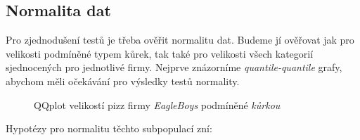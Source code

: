 \subsection{Normalita dat}%
\label{sub:normalita_dat}
Pro zjednodušení testů je třeba ověřit normalitu dat. Budeme jí ověřovat jak pro velikosti
podmíněné typem kůrek, tak také pro velikosti všech kategorií sjednocených pro jednotlivé firmy.
Nejprve znázorníme \emph{quantile-quantile} grafy, abychom měli očekávání pro výsledky testů
normality.

\begin{figure}[H]
	\centering
	
	\caption{QQplot velikostí pizz firmy \emph{EagleBoys} podmíněné \emph{kůrkou}}
	\label{fig:qqplots_crusts_eagle}
\end{figure}

Hypotézy pro normalitu těchto subpopulací zní:

